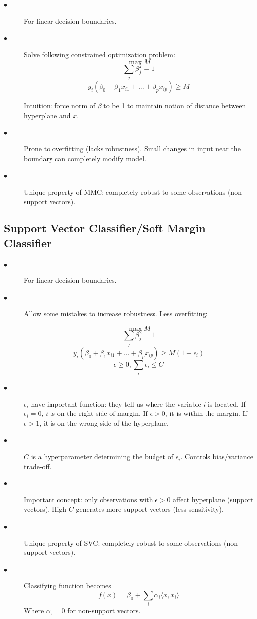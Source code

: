 \documentclass{article}
\begin{document}
\begin{description}
    \item[$\bullet$]For linear decision boundaries.
    \item[$\bullet$] Solve following constrained optimization problem:
    \[\max M\]
    \[\sum_j \beta_j^2 = 1\]
    \[y_i(\beta_0 + \beta_1x_{i1} + ... + \beta_px_{ip}) \geq M\]
    
    Intuition: force norm of \textbf{$\beta$} to be 1 to maintain notion of distance between hyperplane and $x$.
    
    \item[$\bullet$] Prone to overfitting (lacks robustness). Small changes in input near the boundary can completely modify model.
    
     \item[$\bullet$] Unique property of MMC: completely robust to some observations (non-support vectors).
    
\end{description}

\subsection{Support Vector Classifier/Soft Margin Classifier}

\begin{description}
    \item[$\bullet$] For linear decision boundaries.
    
    \item[$\bullet$] Allow some mistakes to increase robustness. Less overfitting:
    
        \[\max M\]
    \[\sum_j \beta_j^2 = 1\]
    \[y_i(\beta_0 + \beta_1x_{i1} + ... + \beta_px_{ip}) \geq M(1-\epsilon_i)\]
    \[\epsilon\geq 0, \sum_i \epsilon_i \leq C\]
    
    \item[$\bullet$] $\epsilon_i$ have important function: they tell us where the variable $i$ is located. If $\epsilon_i=0$, $i$ is on the right side of margin. If $\epsilon>0$, it is within the margin. If $\epsilon>1$, it is on the wrong side of the hyperplane.
    
    \item[$\bullet$] $C$ is a hyperparameter determining the budget of $\epsilon_i$. Controls bias/variance trade-off.
    
     \item[$\bullet$] Important concept: only observations with $\epsilon>0$ affect hyperplane (support vectors). High $C$ generates more support vectors (less sensitivity).
     
     \item[$\bullet$] Unique property of SVC: completely robust to some observations (non-support vectors).
     
       \item[$\bullet$] Classifying function becomes
       \[f(x) = \beta_0 + \sum_i \alpha_i \langle x,x_i \rangle\]
       Where $\alpha_i=0$ for non-support vectors.
\end{description}
\end{document}
